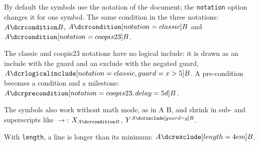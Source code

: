 By default the symbols use the notation of the document; the
\texttt{notation} option changes it for one symbol. The same
condition in the three notations: $A \dcrcondition B$,
$A \dcrcondition[notation=classic] B$ and
$A \dcrcondition[notation=coopis23] B$.

The classic and coopis23 notations have no logical include: it is
drawn as an include with the guard and an exclude with the negated
guard, $A \dcrlogicalinclude[notation=classic, guard={x > 5}] B$.
A pre-condition becomes a condition and a milestone:
$A \dcrprecondition[notation=coopis23, delay=5d] B$.

The symbols also work without math mode, as in A \dcrresponse B, and
shrink in sub- and superscripts like $\rightarrow$:
$X_{A \dcrcondition B}$, $Y^{A \dcrinclude[guard=g] B}$.

With \texttt{length}, a line is longer than its minimum:
$A \dcrexclude[length=4em] B$.
